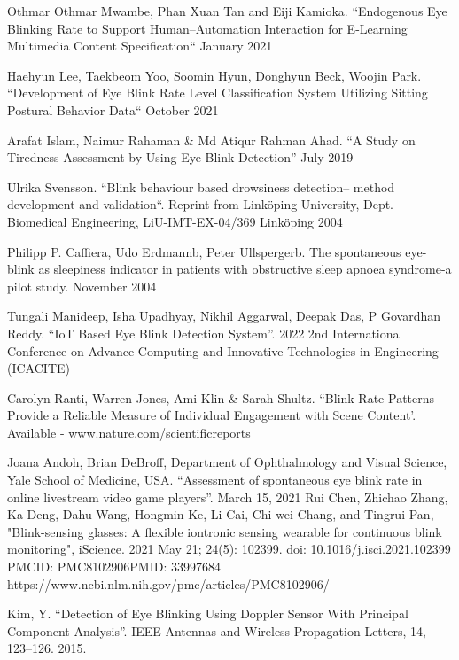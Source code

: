 \documentclass[conference]{IEEEtran}
\begin{document}
\renewcommand{\refname}{References \& Bibliography}
\begin{thebibliography}{00}

Othmar Othmar Mwambe, Phan Xuan Tan and Eiji Kamioka. “Endogenous Eye Blinking Rate to Support Human–Automation Interaction for E-Learning Multimedia Content Specification“ January 2021

Haehyun Lee, Taekbeom Yoo, Soomin Hyun, Donghyun Beck, Woojin Park. “Development of Eye Blink Rate Level Classification System Utilizing Sitting Postural Behavior Data“ October 2021

Arafat Islam, Naimur Rahaman \& Md Atiqur Rahman Ahad. “A Study on Tiredness Assessment by Using Eye Blink Detection”  July 2019

Ulrika Svensson. “Blink behaviour based drowsiness detection– method development and validation“. Reprint from Linköping University, Dept. Biomedical Engineering, LiU-IMT-EX-04/369 Linköping 2004

Philipp P. Caffiera, Udo Erdmannb, Peter Ullspergerb. The spontaneous eye-blink as sleepiness indicator in patients with obstructive sleep apnoea syndrome-a pilot study. November 2004

Tungali Manideep, Isha Upadhyay, Nikhil Aggarwal, Deepak Das, P Govardhan Reddy. “IoT Based Eye Blink Detection System”. 2022 2nd International Conference on Advance Computing and Innovative Technologies in Engineering (ICACITE)

Carolyn Ranti, Warren Jones, Ami Klin \& Sarah Shultz. “Blink Rate Patterns Provide a Reliable Measure of Individual Engagement with Scene Content’. Available - www.nature.com/scientificreports

Joana Andoh, Brian DeBroff, Department of Ophthalmology and Visual Science, Yale School of Medicine, USA. “Assessment of spontaneous eye blink rate in online livestream video game players”. March 15, 2021
Rui Chen, Zhichao Zhang, Ka Deng, Dahu Wang, Hongmin Ke, Li Cai, Chi-wei Chang, and Tingrui Pan, "Blink-sensing glasses: A flexible iontronic sensing wearable for continuous blink monitoring",  iScience. 2021 May 21; 24(5): 102399. doi: 10.1016/j.isci.2021.102399 PMCID: PMC8102906PMID: 33997684
https://www.ncbi.nlm.nih.gov/pmc/articles/PMC8102906/

Kim, Y. “Detection of Eye Blinking Using Doppler Sensor With Principal Component Analysis”. IEEE Antennas and Wireless Propagation Letters, 14, 123–126. 2015.


\end{thebibliography}
\end{document}
